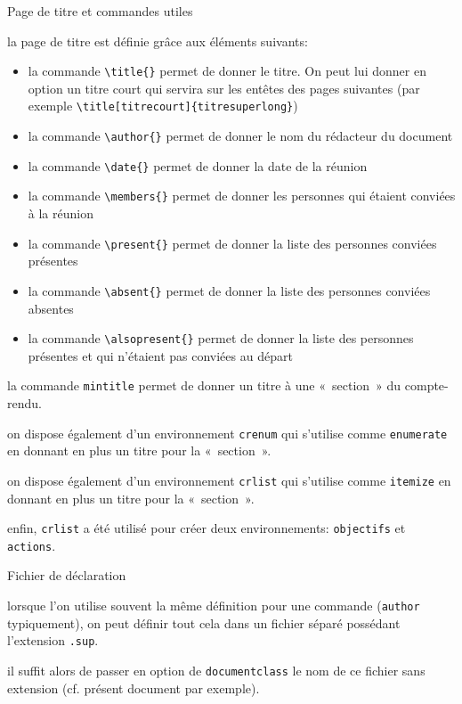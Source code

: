\documentclass[french,cr]{supaero-mins}
\begin{document}
\begin{crlist}{Page de titre et commandes utiles}
\item la page de titre est définie grâce aux éléments suivants:

  \begin{itemize}
  \item la commande \verb!\title{}! permet de donner le titre. On peut
    lui donner en option un titre court qui servira sur les entêtes
    des pages suivantes (par exemple
    \verb!\title[titrecourt]{titresuperlong}!)
  \item la commande \verb!\author{}! permet de donner le nom du
    rédacteur du document
  \item la commande \verb!\date{}! permet de donner la date de la
    réunion
  \item la commande \verb!\members{}! permet de donner les personnes
    qui étaient conviées à la réunion
  \item la commande \verb!\present{}! permet de donner la liste des
    personnes conviées présentes
  \item la commande \verb!\absent{}! permet de donner la liste des
    personnes conviées absentes
  \item la commande \verb!\alsopresent{}! permet de donner la liste
    des personnes présentes et qui n'étaient pas conviées au départ
  \end{itemize}

\item la commande \verb!mintitle! permet de donner un titre à une
  «~section~» du compte-rendu.
\item on dispose également d'un environnement \verb!crenum! qui
  s'utilise comme \verb!enumerate! en donnant en plus un titre pour la
  «~section~».
\item on dispose également d'un environnement \verb!crlist! qui
  s'utilise comme \verb!itemize! en donnant en plus un titre pour la
  «~section~».
\item enfin, \verb!crlist! a été utilisé pour créer deux
  environnements: \verb!objectifs! et \verb!actions!.
\end{crlist}

\begin{crlist}{Fichier de déclaration}
\item lorsque l'on utilise souvent la même définition pour une
  commande (\verb!author! typiquement), on peut définir tout cela dans
  un fichier séparé possédant l'extension \verb!.sup!.
\item il suffit alors de passer en option de \verb!documentclass! le
  nom de ce fichier sans extension (cf. présent document par exemple).
\end{crlist}
\end{document}
